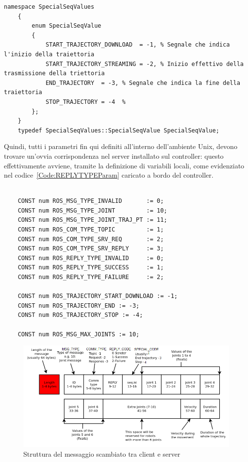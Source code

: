 \begin{lstlisting}[style=Matlab-editor,caption=Definizione dei codici con uso speciale,captionpos=b,label={Code:Special_Param}, basicstyle=\tiny\ttfamily,frame=trBL]
	namespace SpecialSeqValues
	{
		enum SpecialSeqValue
		{
			START_TRAJECTORY_DOWNLOAD  = -1, % Segnale che indica l'inizio della traiettoria
			START_TRAJECTORY_STREAMING = -2, % Inizio effettivo della trasmissione della triettoria
			END_TRAJECTORY  = -3, % Segnale che indica la fine della traiettoria
			STOP_TRAJECTORY = -4  %
		};
	}
	typedef SpecialSeqValues::SpecialSeqValue SpecialSeqValue;
\end{lstlisting}

Quindi, tutti i parametri fin qui definiti all'interno dell'ambiente Unix, devono trovare un'ovvia corrispondenza nel server installato sul controller: questo effettivamente avviene, tramite la definizione di variabili locali, come evidenziato nel codice~\vref{Code:REPLYTYPEParam} caricato a bordo del controller.
\begin{lstlisting}[style=Matlab-editor,caption=Definizione dei parametri del campo REPLY\_CODE,captionpos=b,label={Code:REPLYTYPEParam}, basicstyle=\tiny\ttfamily,frame=trBL]

	CONST num ROS_MSG_TYPE_INVALID       := 0;
	CONST num ROS_MSG_TYPE_JOINT         := 10;  
	CONST num ROS_MSG_TYPE_JOINT_TRAJ_PT := 11;  
	CONST num ROS_COM_TYPE_TOPIC         := 1;
	CONST num ROS_COM_TYPE_SRV_REQ       := 2;
	CONST num ROS_COM_TYPE_SRV_REPLY     := 3;
	CONST num ROS_REPLY_TYPE_INVALID     := 0;
	CONST num ROS_REPLY_TYPE_SUCCESS     := 1;
	CONST num ROS_REPLY_TYPE_FAILURE     := 2;
	
	CONST num ROS_TRAJECTORY_START_DOWNLOAD := -1;
	CONST num ROS_TRAJECTORY_END := -3;
	CONST num ROS_TRAJECTORY_STOP := -4;
	
	CONST num ROS_MSG_MAX_JOINTS := 10;  
\end{lstlisting}

\begin{figure}
	\centering
	\includegraphics[width=1\textwidth]{Immagini/Message_Protocol}
	\caption{Struttura del messaggio scambiato tra client e server}
	\label{fig:MessageProtocol}
\end{figure}
